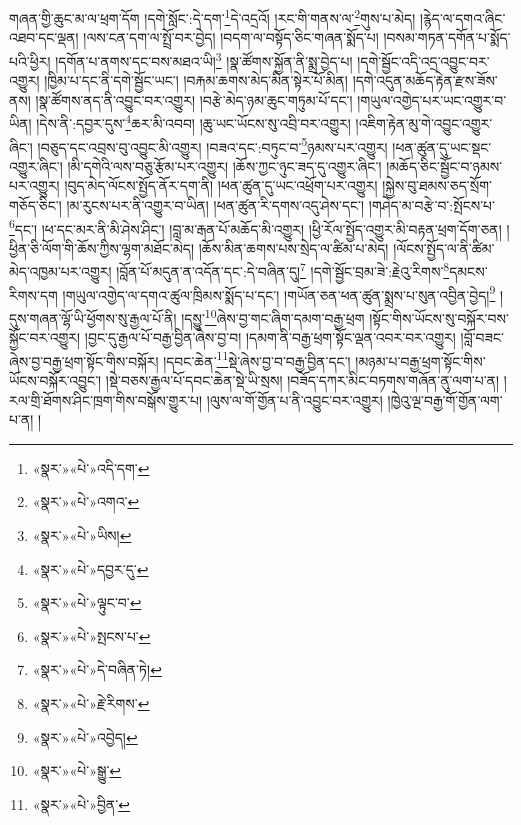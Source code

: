 གཞན་གྱི་ཆུང་མ་ལ་ཕྲག་དོག །དགེ་སློང་:དེ་དག་\footnote{«སྣར་»«པེ་»འདི་དག་}དེ་འདྲའོ། །རང་གི་གནས་ལ་\footnote{«སྣར་»«པེ་»འགའ་}གུས་པ་མེད། །རྙེད་ལ་དགའ་ཞིང་འཐབ་དང་ལྡན། །ལས་ངན་དག་ལ་སྤྲོ་བར་བྱེད། །བདག་ལ་བསྟོད་ཅིང་གཞན་སྨོད་པ། །བསམ་གཏན་དགོན་པ་སྨོད་པའི་ཕྱིར། །དགོན་པ་ནགས་དང་བས་མཐའ་ཡི།\footnote{«སྣར་»«པེ་»ཡིས།} །སྣ་ཚོགས་སྐྱོན་ནི་སྨྲ་བྱེད་པ། །དགེ་སྦྱོང་འདི་འདྲ་འབྱུང་བར་འགྱུར། །ཁྱིམ་པ་དང་ནི་དགེ་སྦྱོང་ཡང་། །བརྐམ་ཆགས་མེད་མིན་སྟེར་པོ་མིན། །དགེ་འདུན་མཆོད་རྟེན་རྫས་ཟོས་ནས། །སྣ་ཚོགས་ནད་ནི་འབྱུང་བར་འགྱུར། །བརྩེ་མེད་ཉམ་ཆུང་གཏུམ་པོ་དང་། །གཡུལ་འགྱེད་པར་ཡང་འགྱུར་བ་ཡིན། །དེས་ནི་:དབྱར་དུས་\footnote{«སྣར་»«པེ་»དབྱར་དུ་}ཆར་མི་འབབ། །ཆུ་ཡང་ཡོངས་སུ་འབྲི་བར་འགྱུར། །འཇིག་རྟེན་མུ་གེ་འབྱུང་འགྱུར་ཞིང་། །བཅུད་དང་འབྲས་བུ་འབྱུང་མི་འགྱུར། །བཟའ་དང་:བཏུང་བ་\footnote{«སྣར་»«པེ་»ལྟུང་བ་}ཉམས་པར་འགྱུར། །ཕན་ཚུན་དུ་ཡང་སྡང་འགྱུར་ཞིང་། །མི་དགེའི་ལས་བཅུ་རྩོམ་པར་འགྱུར། །ཆོས་ཀྱང་ཉུང་ཟད་དུ་འགྱུར་ཞིང་། །མཆོད་ཅིང་སྦྱོང་བ་ཉམས་པར་འགྱུར། །བུད་མེད་ལོངས་སྤྱོད་ནོར་དག་ནི། །ཕན་ཚུན་དུ་ཡང་འཕྲོག་པར་འགྱུར། །སྐྱེས་བུ་ཐམས་ཅད་སྲོག་གཅོད་ཅིང་། །མ་རུངས་པར་ནི་འགྱུར་བ་ཡིན། །ཕན་ཚུན་རི་དགས་འདུ་ཤེས་དང་། །གཤེད་མ་བརྩེ་བ་:སྤོངས་པ་\footnote{«སྣར་»«པེ་»སྤངས་པ་}དང་། །ཕ་དང་མར་ནི་མི་ཤེས་ཤིང་། །བླ་མ་རྒན་པོ་མཆོད་མི་འགྱུར། །ཕྱི་རོལ་སྤྱོད་འགྱུར་མི་བརྟན་ཕྲག་དོག་ཅན། །ཕྱིན་ཅི་ལོག་གི་ཆོས་ཀྱིས་ལྷག་མཐོང་མེད། །ཆོས་མིན་ཆགས་པས་སྲེད་ལ་ཚིམ་པ་མེད། །ལོངས་སྤྱོད་ལ་ནི་ཚིམ་མེད་འཁྱམ་པར་འགྱུར། །བློན་པོ་མདུན་ན་འདོན་དང་:དེ་བཞིན་དུ།\footnote{«སྣར་»«པེ་»དེ་བཞིན་ཏེ།} །དགེ་སྦྱོང་བྲམ་ཟེ་:རྗེའུ་རིགས་\footnote{«སྣར་»«པེ་»རྗེ་རིགས་}དམངས་རིགས་དག །གཡུལ་འགྱེད་ལ་དགའ་ཚུལ་ཁྲིམས་སྨོད་པ་དང་། །གཡོན་ཅན་ཕན་ཚུན་སྨྲས་པ་སུན་འབྱིན་བྱེད།\footnote{«སྣར་»«པེ་»འབྱེད།} །དུས་གཞན་ལྷོ་ཡི་ཕྱོགས་སུ་རྒྱལ་པོ་ནི། །དསྱུ་\footnote{«སྣར་»«པེ་»སྒྱུ་}ཞེས་བྱ་གང་ཞིག་དམག་བརྒྱ་ཕྲག །སྟོང་གིས་ཡོངས་སུ་བསྐོར་བས་སྐྱོང་བར་འགྱུར། །བྱང་དུ་རྒྱལ་པོ་བརྒྱ་བྱིན་ཞེས་བྱ་བ། །དམག་ནི་བརྒྱ་ཕྲག་སྟོང་ལྡན་འབར་བར་འགྱུར། །བློ་བཟང་ཞེས་བྱ་བརྒྱ་ཕྲག་སྟོང་གིས་བསྐོར། །དབང་ཆེན་\footnote{«སྣར་»«པེ་»བྱིན་}སྡེ་ཞེས་བྱ་བ་བརྒྱ་བྱིན་དང་། །མཉམ་པ་བརྒྱ་ཕྲག་སྟོང་གིས་ཡོངས་བསྐོར་འབྱུང་། །སྡེ་བཅས་རྒྱལ་པོ་དབང་ཆེན་སྡེ་ཡི་སྲས། །བཟོད་དཀར་མིང་བཏགས་གཞོན་ནུ་ལག་པ་ན། །རལ་གྲི་ཐོགས་ཤིང་ཁྲག་གིས་བསྒོས་གྱུར་པ། །ལུས་ལ་གོ་གྱོན་པ་ནི་འབྱུང་བར་འགྱུར། །ཁྱེའུ་ལྔ་བརྒྱ་གོ་གྱོན་ལག་པ་ན། །
